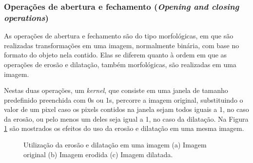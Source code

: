 
\subsubsection{Operações de abertura e fechamento (\textit{Opening and closing operations})}

As operações de abertura e fechamento são do tipo morfológicas, em que são realizadas transformações em uma imagem, normalmente binária, com base no formato do objeto nela contido. Elas se diferem quanto à ordem em que as operações de erosão e dilatação, também morfológicas, são realizadas em uma imagem.

Nestas duas operações, um \textit{kernel}, que consiste em uma janela de tamanho predefinido preenchida com 0s ou 1s, percorre a imagem original, substituindo o valor de um pixel caso os pixels contidos na janela sejam todos iguais a 1, no caso da erosão, ou pelo menos um deles seja igual a 1, no caso da dilatação. Na Figura \ref{img:eros_dilat} são mostrados os efeitos do uso da erosão e dilatação em uma mesma imagem.

\begin{figure}[H]
\centering
    \caption{\label{img:eros_dilat} Utilização da erosão e dilatação em uma imagem (a) Imagem original (b) Imagem erodida (c) Imagem dilatada.}
\end{figure}

